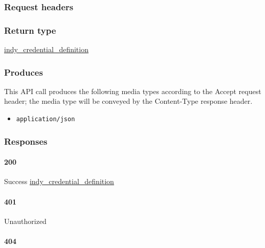 \hypertarget{request-headers-33}{%
\subsubsection{Request headers}\label{request-headers-33}}

\hypertarget{return-type-49}{%
\subsubsection{Return type}\label{return-type-49}}

\protect\hyperlink{indy_credential_definition}{indy\_credential\_definition}

\hypertarget{produces-61}{%
\subsubsection{Produces}\label{produces-61}}

This API call produces the following media types according to the
{Accept} request header; the media type will be conveyed by the
{Content-Type} response header.

\begin{itemize}
\tightlist
\item
  \texttt{application/json}
\end{itemize}

\hypertarget{responses-61}{%
\subsubsection{Responses}\label{responses-61}}

\hypertarget{section-203}{%
\paragraph{200}\label{section-203}}

Success
\protect\hyperlink{indy_credential_definition}{indy\_credential\_definition}

\hypertarget{section-204}{%
\paragraph{401}\label{section-204}}

Unauthorized \protect\hyperlink{}{}

\hypertarget{section-205}{%
\paragraph{404}\label{section-205}}

